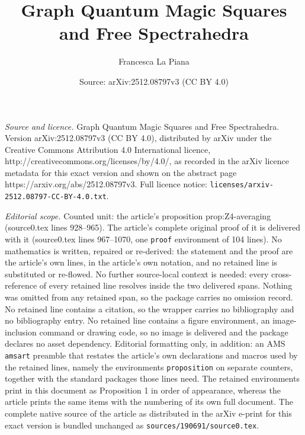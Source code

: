 \documentclass[10pt,a4paper]{amsart}
\title{Graph Quantum Magic Squares and Free Spectrahedra}
\author{Francesca La Piana}
\date{Source: arXiv:2512.08797v3 (CC BY 4.0)}
\begin{document}
\maketitle

\noindent\emph{Source and licence.} Graph Quantum Magic Squares and Free Spectrahedra. Version arXiv:2512.08797v3 (CC BY 4.0), distributed by arXiv under the Creative Commons Attribution 4.0 International licence, http://creativecommons.org/licenses/by/4.0/, as recorded in the arXiv licence metadata for this exact version and shown on the abstract page https://arxiv.org/abs/2512.08797v3. Full licence notice: \texttt{licenses/arxiv-2512.08797-CC-BY-4.0.txt}.\par\smallskip

\noindent\textit{Editorial scope.} Counted unit: the article's proposition prop:Z4-averaging (source0.tex lines 928--965). The article's complete original proof of it is delivered with it (source0.tex lines 967--1070, one \texttt{proof} environment of 104 lines). No mathematics is written, repaired or re-derived: the statement and the proof are the article's own lines, in the article's own notation, and no retained line is substituted or re-flowed.  No further source-local context is needed: every cross-reference of every retained line resolves inside the two delivered spans.  Nothing was omitted from any retained span, so the package carries no omission record.  No retained line contains a citation, so the wrapper carries no bibliography and no bibliography entry.  No retained line contains a figure environment, an image-inclusion command or drawing code, so no image is delivered and the package declares no asset dependency.  Editorial formatting only, in addition: an AMS \texttt{amsart} preamble that restates the article's own declarations and macros used by the retained lines, namely the environments \texttt{proposition} on separate counters, together with the standard packages those lines need.  The retained environments print in this document as Proposition 1 in order of appearance, whereas the article prints the same items with the numbering of its own full document.  The complete native source of the article as distributed in the arXiv e-print for this exact version is bundled unchanged as \texttt{sources/190691/source0.tex}.
\end{document}
